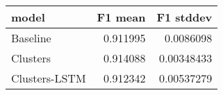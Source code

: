 \begin{tabular}{lrr}
\toprule
 model         &   F1 mean &   F1 stddev \\
\midrule
 Baseline      &  0.911995 &  0.0086098  \\
 Clusters      &  0.914088 &  0.00348433 \\
 Clusters-LSTM &  0.912342 &  0.00537279 \\
\bottomrule
\end{tabular}